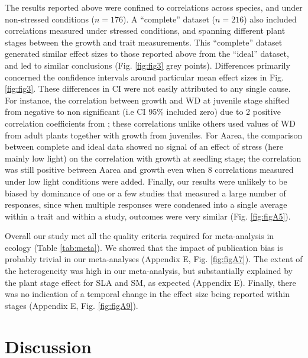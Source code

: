 \documentclass[a4paper,11pt]{article}
\begin{document}
The results reported above were confined to correlations across species, and under non-stressed conditions ($n = 176$). A ``complete'' dataset ($n = 216$) also included correlations measured under stressed conditions, and spanning different plant stages between the growth and trait measurements. This ``complete'' dataset generated similar effect sizes to those reported above from the ``ideal'' dataset, and led to similar conclusions (Fig. \ref{fig:fig3} grey points). Differences primarily concerned the confidence intervals around particular mean effect sizes in Fig. \ref{fig:fig3}. These differences in CI were not easily attributed to any single cause. For instance, the correlation between growth and WD at juvenile stage shifted from negative to non significant (i.e CI 95\% included zero) due to 2 positive correlation coefficients from \citet{Augspurger:1984ct};  these correlations unlike others used values of WD from adult plants together with growth from juveniles. For Aarea, the comparison between complete and ideal data showed no signal of an effect of stress (here mainly low light) on the correlation with growth at seedling stage; the correlation was still positive between Aarea and growth even when 8 correlations measured under low light conditions were added. Finally, our results were unlikely to be biased by dominance of one or a few studies that measured a large number of responses, since when multiple responses were condensed into a single average within a trait and within a study, outcomes were very similar (Fig. \ref{fig:figA5}).

Overall our study met all the quality criteria required for meta-analysis in ecology (Table \ref{tab:meta}). We showed that the impact of publication bias is probably trivial in our meta-analyses (Appendix E, Fig. \ref{fig:figA7}). The extent of the heterogeneity was high in our meta-analysis,  but substantially explained by the plant stage effect for SLA and SM, as expected (Appendix E). Finally, there was no indication of a temporal change in the effect size being reported within stages (Appendix E, Fig. \ref{fig:figA9}).


\section*{Discussion}\label{discussion}
\end{document}

